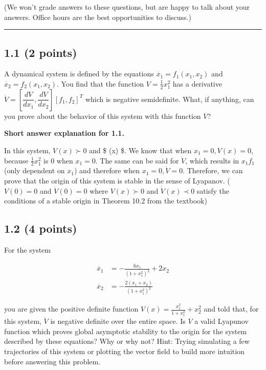 \documentclass[11pt]{article}
\begin{document}
(We won't grade answers to these questions, but are happy to talk about
your answers. Office hours are the best opportunities to discuss.)

\begin{center}\rule{0.5\linewidth}{\linethickness}\end{center}

    \subsection{1.1 (2 points)}\label{points}

A dynamical system is defined by the equations
\(\dot{x_1}=f_1(x_1,x_2)\) and \(\dot{x_2}=f_2(x_1,x_2)\). You find that
the function \(V=\frac{1}{2}x_1^2\) has a derivative
\(\dot{V} = \left[\dfrac{dV}{dx_1}, \dfrac{dV}{dx_2}\right] \left[ f_1, f_2 \right]^T\)
which is negative semidefinite. What, if anything, can you prove about
the behavior of this system with this function \(V\)?

    \textbf{Short answer explanation for 1.1.}

In this system, \(V(x) \succ 0\) and \$ (x) \$. We know
that when \(x_1 = 0, V(x) = 0\), because \(\frac{1}{2}x_1^2\) is 0 when
\(x_1 = 0\). The same can be said for \(\dot{V}\), which results in
\(x_1f_1\) (only dependent on \(x_1\)) and therefore when
\(x_1 = 0, \dot{V} = 0\). Therefore, we can prove that the origin of
this system is stable in the sense of Lyapanov. (\(V(0) = 0\) and
\(\dot{V}(0) = 0\) where \(V(x) \succ 0\) and \(\dot{V}(x) \prec 0\)
satisfy the conditions of a stable origin in Theorem 10.2 from the
textbook)

    \subsection{1.2 (4 points)}\label{points}

For the system

\begin{align}
\dot{x_1}&=-\frac{6x_1}{(1+x_1^2)^2}+2x_2  \\
\dot{x_2}&=-\frac{2(x_1+x_2)}{(1+x_1^2)^2}
\end{align}

you are given the positive definite function
\(V(x) =\frac{x_1^2}{1 + x_1^2}+ x_2^2\) and told that, for this system,
\(\dot{V}\) is negative definite over the entire space. Is \(V\) a valid
Lyapunov function which proves global asymptotic stability to the origin
for the system described by these equations? Why or why not? Hint:
Trying simulating a few trajectories of this system or plotting the
vector field to build more intuition before answering this problem.
\end{document}
